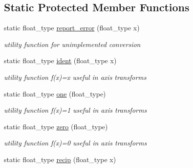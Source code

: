\subsection*{Static Protected Member Functions}
\begin{DoxyCompactItemize}
\item 
\hypertarget{classc2__transformation_a79f51b6fefc32d826735daf184f76613}{static float\-\_\-type \hyperlink{classc2__transformation_a79f51b6fefc32d826735daf184f76613}{report\-\_\-error} (float\-\_\-type x)}\label{classc2__transformation_a79f51b6fefc32d826735daf184f76613}

\begin{DoxyCompactList}\small\item\em utility function for unimplemented conversion \end{DoxyCompactList}\item 
\hypertarget{classc2__transformation_a2dfa80bc8a5f4103b8093890627c194b}{static float\-\_\-type \hyperlink{classc2__transformation_a2dfa80bc8a5f4103b8093890627c194b}{ident} (float\-\_\-type x)}\label{classc2__transformation_a2dfa80bc8a5f4103b8093890627c194b}

\begin{DoxyCompactList}\small\item\em utility function f(x)=x useful in axis transforms \end{DoxyCompactList}\item 
\hypertarget{classc2__transformation_ad29b2f8bff1298a915fead61babfbf69}{static float\-\_\-type \hyperlink{classc2__transformation_ad29b2f8bff1298a915fead61babfbf69}{one} (float\-\_\-type)}\label{classc2__transformation_ad29b2f8bff1298a915fead61babfbf69}

\begin{DoxyCompactList}\small\item\em utility function f(x)=1 useful in axis transforms \end{DoxyCompactList}\item 
\hypertarget{classc2__transformation_a81a65d1c58abae1f7bed846f736a9887}{static float\-\_\-type \hyperlink{classc2__transformation_a81a65d1c58abae1f7bed846f736a9887}{zero} (float\-\_\-type)}\label{classc2__transformation_a81a65d1c58abae1f7bed846f736a9887}

\begin{DoxyCompactList}\small\item\em utility function f(x)=0 useful in axis transforms \end{DoxyCompactList}\item 
\hypertarget{classc2__transformation_a201c2df7a29fc20946f3814816d88bbc}{static float\-\_\-type \hyperlink{classc2__transformation_a201c2df7a29fc20946f3814816d88bbc}{recip} (float\-\_\-type x)}\label{classc2__transformation_a201c2df7a29fc20946f3814816d88bbc}


\end{DoxyCompactItemize}
